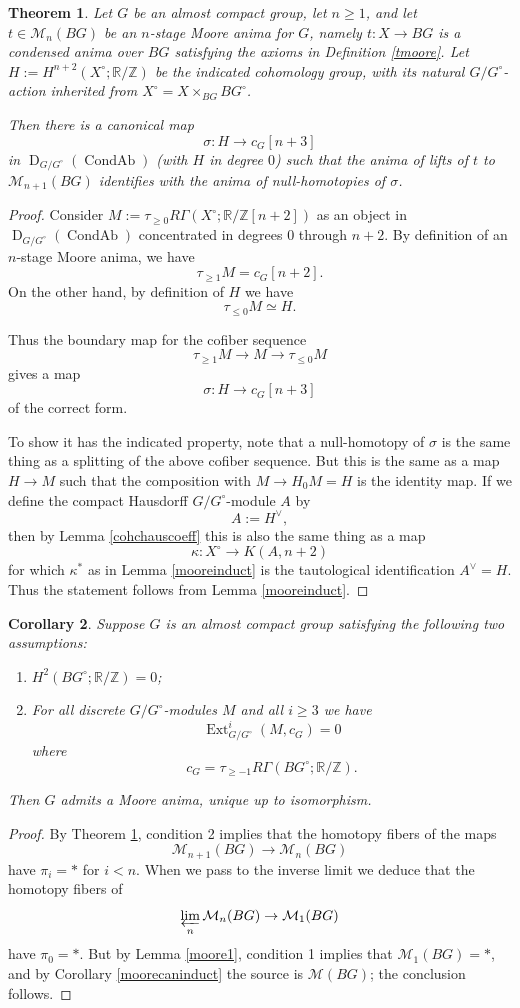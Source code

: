 \documentclass[12pt]{article}
\newtheorem{theorem}{Theorem}[section]
\newtheorem{corollary}[theorem]{Corollary}
\theoremstyle{definition}
\newcommand{\on}{\operatorname}
\newcommand{\mc}{\mathcal}
\newcommand{\mbb}{\mathbb}
\begin{document}
\begin{theorem}\label{mooreobstruct}
Let $G$ be an almost compact group, let $n\geq 1$, and let $t \in \mc{M}_n(BG)$ be an $n$-stage Moore anima for $G$, namely $t:X\to BG$ is a condensed anima over $BG$ satisfying the axioms in Definition \ref{tmoore}.  Let $H:= H^{n+2}(X^\circ;\mbb{R}/\mbb{Z})$ be the indicated cohomology group, with its natural $G/G^\circ$-action inherited from $X^\circ = X\times_{BG} BG^\circ$.

Then there is a canonical map
$$\sigma: H \to c_G[n+3]$$
in $\on{D}_{G/G^\circ}(\on{CondAb})$ (with $H$ in degree $0$) such that the anima of lifts of $t$ to $\mc{M}_{n+1}(BG)$ identifies with the anima of null-homotopies of $\sigma$.
\end{theorem}
\begin{proof}
Consider $M:=\tau_{\geq 0} R\Gamma(X^\circ;\mbb{R}/\mbb{Z}[n+2])$ as an object in $\on{D}_{G/G^\circ}(\on{CondAb})$ concentrated in degrees $0$ through $n+2$.  By definition of an $n$-stage Moore anima, we have
$$\tau_{\geq 1} M = c_G[n+2].$$
On the other hand, by definition of $H$ we have
$$\tau_{\leq 0}M \simeq H.$$

Thus the boundary map for the cofiber sequence
$$\tau_{\geq 1}M \to M \to \tau_{\leq 0}M$$
gives a map
$$\sigma: H \to c_G[n+3]$$
of the correct form.

To show it has the indicated property, note that a null-homotopy of $\sigma$ is the same thing as a splitting of the above cofiber sequence.  But this is the same as a map $H \to M$ such that the composition with $M\to H_0M = H$ is the identity map.  If we define the compact Hausdorff $G/G^\circ$-module $A$ by
$$A := H^\vee,$$
then by Lemma \ref{cohchauscoeff} this is also the same thing as a map
$$\kappa: X^\circ \to K(A,n+2)$$
for which $\kappa^\ast$ as in Lemma \ref{mooreinduct} is the tautological identification $A^\vee = H$.  Thus the statement follows from Lemma \ref{mooreinduct}.
\end{proof}

\begin{corollary}\label{mooreconclusion}
Suppose $G$ is an almost compact group satisfying the following two assumptions:
\begin{enumerate}
\item $H^2(BG^\circ;\mbb{R}/\mbb{Z})=0$;
\item For all discrete $G/G^\circ$-modules $M$ and all $i\geq 3$ we have
$$\on{Ext}^i_{G/G^\circ}(M,c_G)=0$$
where
$$c_G = \tau_{\geq -1} R\Gamma(BG^\circ;\mbb{R}/\mbb{Z}).$$
\end{enumerate}
Then $G$ admits a Moore anima, unique up to isomorphism.
\end{corollary}
\begin{proof}
By Theorem \ref{mooreobstruct}, condition 2 implies that the homotopy fibers of the maps
$$\mc{M}_{n+1}(BG) \to \mc{M}_n(BG)$$
have $\pi_i=\ast$ for $i<n$.  When we pass to the inverse limit we deduce that the homotopy fibers of 
$$\varprojlim_n \mc{M}_n(BG) \to \mc{M}_1(BG)$$
have $\pi_0=\ast$.  But by Lemma \ref{moore1}, condition 1 implies that $\mc{M}_1(BG)=\ast$, and by Corollary \ref{moorecaninduct} the source is $\mc{M}(BG)$; the conclusion follows.
\end{proof}
\end{document}
